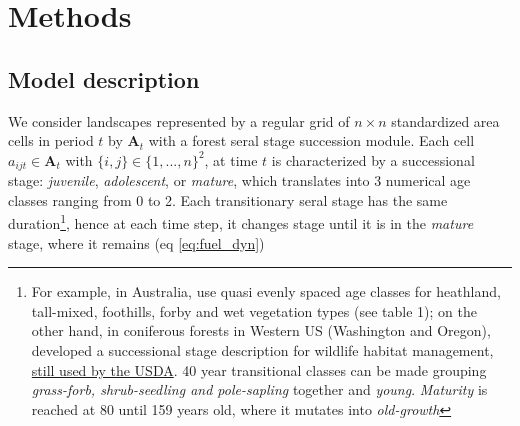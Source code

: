 \clearpage

\section{Methods}
\label{section:methods}
\subsection{Model description}

We consider landscapes represented by a regular grid of $n\times n$ standardized area cells in period $t$ by $\mathbf{A}_t$ with a forest seral stage succession module. 
Each cell $a_{ijt} \in \mathbf{A}_t$ with $\{i,j\} \in \{1, ...,n\}^2$, at time $t$ is characterized by a successional stage: \textit{juvenile}, \textit{adolescent}, or \textit{mature}, which translates into 3 numerical age classes ranging from 0 to 2. 
Each transitionary seral stage has the same duration\footnote{For example, in Australia, \cite{mccoll_gausden_pathways_2019} use quasi evenly spaced age classes for heathland, tall-mixed, foothills, forby and wet vegetation types (see table 1); on the other hand, in coniferous forests in Western US (Washington and Oregon),\cite{thomas_wildlife_1979} developed a successional stage description for wildlife habitat management, \href{https://www.fs.usda.gov/Internet/FSE_DOCUMENTS/stelprdb5413728.pdf}{still used by the USDA}. 40 year transitional classes can be made grouping \textit{grass-forb, shrub-seedling and pole-sapling} together and \textit{young}. \textit{Maturity} is reached at 80 until 159 years old, where it mutates into \textit{old-growth}}, hence at each time step, it changes stage until it is in the \textit{mature} stage, where it remains (eq \ref{eq:fuel_dyn})

